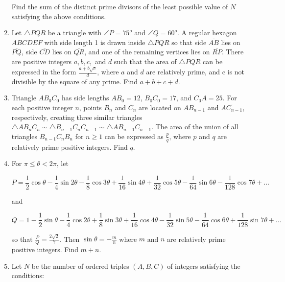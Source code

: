 \documentclass{article}
\begin{document}
\begin{enumerate}[label=\arabic*., itemsep=0.5em]
Find the sum of the distinct prime divisors of the least possible value of \(N\) satisfying the above conditions.\par \vspace{0.5em}\item Let \(\bigtriangleup PQR\) be a triangle with \(\angle P = 75^o\) and \(\angle Q = 60^o\). A regular hexagon \(ABCDEF\) with side length 1 is drawn inside \(\triangle PQR\) so that side \(\overline{AB}\) lies on \(\overline{PQ}\), side \(\overline{CD}\) lies on \(\overline{QR}\), and one of the remaining vertices lies on \(\overline{RP}\). There are positive integers \(a, b, c, \) and \(d\) such that the area of \(\triangle PQR\) can be expressed in the form \(\frac{a+b\sqrt{c}}{d}\), where \(a\) and \(d\) are relatively prime, and c is not divisible by the square of any prime. Find \(a+b+c+d\).\par \vspace{0.5em}\item Triangle \(AB_0C_0\) has side lengths \(AB_0 = 12\), \(B_0C_0 = 17\), and \(C_0A = 25\). For each positive integer \(n\), points \(B_n\) and \(C_n\) are located on \(\overline{AB_{n-1}}\) and \(\overline{AC_{n-1}}\), respectively, creating three similar triangles \(\triangle AB_nC_n \sim \triangle B_{n-1}C_nC_{n-1} \sim \triangle AB_{n-1}C_{n-1}\). The area of the union of all triangles \(B_{n-1}C_nB_n\) for \(n\geq1\) can be expressed as \(\tfrac pq\), where \(p\) and \(q\) are relatively prime positive integers. Find \(q\).\par \vspace{0.5em}\item For \(\pi \le \theta < 2\pi\), let


\begin{equation*}
P=\dfrac12\cos\theta-\dfrac14\sin2\theta-\dfrac18\cos3\theta+\dfrac1{16}\sin4\theta+\dfrac1{32}\cos5\theta-\dfrac1{64}\sin6\theta-\dfrac1{128}\cos7\theta+\ldots
\end{equation*}


and


\begin{equation*}
Q=1-\dfrac12\sin\theta-\dfrac14\cos2\theta+\dfrac1{8}\sin3\theta+\dfrac1{16}\cos4\theta-\dfrac1{32}\sin5\theta-\dfrac1{64}\cos6\theta+\dfrac1{128}\sin7\theta
+\ldots
\end{equation*}


so that \(\frac{P}{Q} = \frac{2\sqrt2}{7}\). Then \(\sin\theta = -\frac{m}{n}\) where \(m\) and \(n\) are relatively prime positive integers. Find \(m+n\).\par \vspace{0.5em}\item Let \(N\) be the number of ordered triples \((A,B,C)\) of integers satisfying the conditions: 


\end{enumerate}
\end{document}
